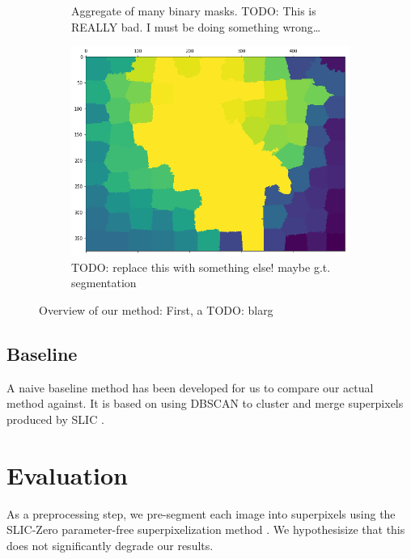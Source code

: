 \documentclass[twocolumn]{article}
\newcommand{\todo}[1]{}
\renewcommand{\todo}[1]{{\color{red} TODO: {#1}}}
\newcommand{\seclab}[1]{\label{sec:#1}}
\newcommand{\figlab}[1]{\label{fig:#1}}
\begin{document}
\begin{figure}[t]
\begin{subfigure}{0.49\linewidth}
    \caption{Aggregate of many binary masks. \todo{This is REALLY bad. I must be doing something wrong\ldots}}
  \end{subfigure}
  \begin{subfigure}{0.49\linewidth}
    \includegraphics[width=\linewidth]{figs/aggregate.png}
    \caption{\todo{replace this with something else! maybe g.t. segmentation}}
  \end{subfigure}

  \caption{
    Overview of our method: First, a \todo{blarg}
  }
  \figlab{process}

\end{figure}

\subsection{Baseline}

A naive baseline method has been developed for us to compare our actual method
against. It is based on using DBSCAN \cite{ester1996density} to cluster and
merge superpixels produced by SLIC \cite{achanta2010slic}.

\section{Evaluation}\seclab{eval}


As a preprocessing step, we pre-segment each image into superpixels using the
SLIC-Zero parameter-free superpixelization method \cite{achanta2010slic}. We
hypothesisize that this does not significantly degrade our results. 
\end{document}
